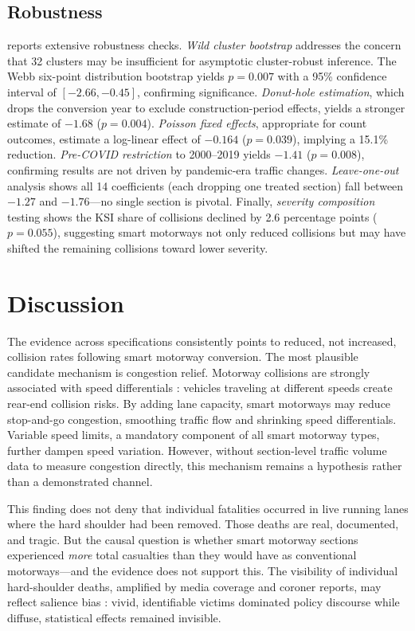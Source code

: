 \documentclass[12pt]{article}
\begin{document}
\subsection{Robustness}



 reports extensive robustness checks. \textit{Wild cluster bootstrap} addresses the concern that 32 clusters may be insufficient for asymptotic cluster-robust inference. The Webb six-point distribution bootstrap yields $p = 0.007$ with a 95\% confidence interval of $[-2.66, -0.45]$, confirming significance. \textit{Donut-hole estimation}, which drops the conversion year to exclude construction-period effects, yields a stronger estimate of $-1.68$ ($p = 0.004$). \textit{Poisson fixed effects}, appropriate for count outcomes, estimate a log-linear effect of $-0.164$ ($p = 0.039$), implying a 15.1\% reduction. \textit{Pre-COVID restriction} to 2000--2019 yields $-1.41$ ($p = 0.008$), confirming results are not driven by pandemic-era traffic changes. \textit{Leave-one-out} analysis shows all 14 coefficients (each dropping one treated section) fall between $-1.27$ and $-1.76$---no single section is pivotal. Finally, \textit{severity composition} testing shows the KSI share of collisions declined by 2.6 percentage points ($p = 0.055$), suggesting smart motorways not only reduced collisions but may have shifted the remaining collisions toward lower severity.


\section{Discussion}

The evidence across specifications consistently points to reduced, not increased, collision rates following smart motorway conversion. The most plausible candidate mechanism is congestion relief. Motorway collisions are strongly associated with speed differentials \citep{elvik_speed_2019}: vehicles traveling at different speeds create rear-end collision risks. By adding lane capacity, smart motorways may reduce stop-and-go congestion, smoothing traffic flow and shrinking speed differentials. Variable speed limits, a mandatory component of all smart motorway types, further dampen speed variation. However, without section-level traffic volume data to measure congestion directly, this mechanism remains a hypothesis rather than a demonstrated channel.

This finding does not deny that individual fatalities occurred in live running lanes where the hard shoulder had been removed. Those deaths are real, documented, and tragic. But the causal question is whether smart motorway sections experienced \textit{more} total casualties than they would have as conventional motorways---and the evidence does not support this. The visibility of individual hard-shoulder deaths, amplified by media coverage and coroner reports, may reflect salience bias \citep{bordalo_salience_2012}: vivid, identifiable victims dominated policy discourse while diffuse, statistical effects remained invisible.
\end{document}

